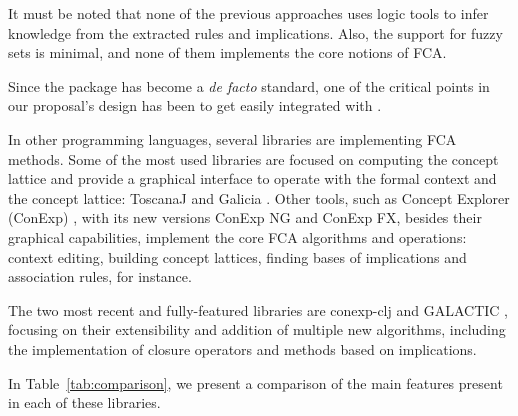 It must be noted that none of the previous approaches uses logic tools
to infer knowledge from the extracted rules and implications. Also, the
support for fuzzy sets is minimal, and none of them implements the core
notions of FCA.

Since the  package has become a \emph{de facto} standard,
one of the critical points in our proposal's design has been to get
 easily integrated with .

In other programming languages, several libraries are implementing FCA
methods. Some of the most used libraries are focused on computing the
concept lattice and provide a graphical interface to operate with the
formal context and the concept lattice: ToscanaJ \citep{Becker_2005} and
Galicia \citep{valtchev2003galicia}. Other tools, such as Concept
Explorer (ConExp) \citep{yevtushenko2000system}, with its new versions
ConExp NG and ConExp FX, besides their graphical capabilities, implement
the core FCA algorithms and operations: context editing, building
concept lattices, finding bases of implications and association rules,
for instance.

The two most recent and fully-featured libraries are conexp-clj
\citep{hanika2019conexp} and GALACTIC \citep{demko2020galactic},
focusing on their extensibility and addition of multiple new algorithms,
including the implementation of closure operators and methods based on
implications.

In Table~\ref{tab:comparison}, we present a comparison of the main
features present in each of these libraries.

